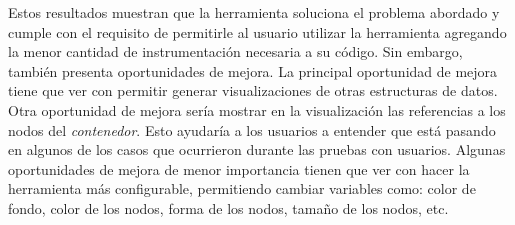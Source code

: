 Estos resultados muestran que la herramienta soluciona el problema abordado y cumple con el requisito de permitirle al usuario utilizar la herramienta agregando la menor cantidad de instrumentación necesaria a su código. Sin embargo, también presenta oportunidades de mejora. La principal oportunidad de mejora tiene que ver con permitir generar visualizaciones de otras estructuras de datos. Otra oportunidad de mejora sería mostrar en la visualización las referencias a los nodos del \textit{contenedor}. Esto ayudaría a los usuarios a entender que está pasando en algunos de los casos que ocurrieron durante las pruebas con usuarios. Algunas oportunidades de mejora de menor importancia tienen que ver con hacer la herramienta más configurable, permitiendo cambiar variables como: color de fondo, color de los nodos, forma de los nodos, tamaño de los nodos, etc.
